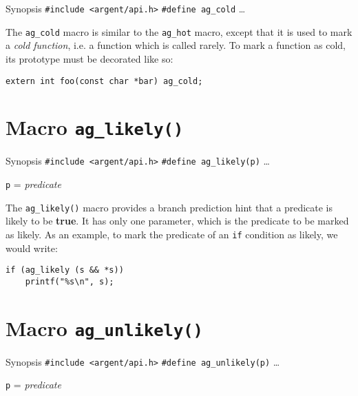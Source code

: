 \begin{bclogo}[logo=\bccrayon, noborder=true, barre=snake, couleurBarre=gray]
    {Synopsis}
  \verb|#include <argent/api.h>|
  \verb|#define ag_cold| \ldots
\end{bclogo}

The \verb|ag_cold| macro is similar to the \verb|ag_hot| macro, except
that it is used to mark a \emph{cold function}, i.e. a function which is called
rarely. To mark a function as cold, its prototype must be decorated like so:

\begin{lstlisting}[linewidth=1.0\linewidth,
    caption=Example use of ag\_cold]
extern int foo(const char *bar) ag_cold;
\end{lstlisting}


%


\section{Macro \texttt{ag\_likely()}}

\begin{bclogo}[logo=\bccrayon, noborder=true, barre=snake, couleurBarre=gray]
    {Synopsis}
  \verb|#include <argent/api.h>|
  \verb|#define ag_likely(p)| \ldots
  \par
  \texttt{p} = \emph{predicate}
\end{bclogo}

The \verb|ag_likely()| macro provides a branch prediction hint that a predicate
is likely to be \textbf{true}. It has only one parameter, which is the predicate 
to be marked as likely. As an example, to mark the predicate of an \verb|if| 
condition as likely, we would write:

\begin{lstlisting}[linewidth=1.0\linewidth,
    caption=Example use of ag\_likely()]
if (ag_likely (s && *s)) 
    printf("%s\n", s);
\end{lstlisting}


%


\section{Macro \texttt{ag\_unlikely()}}

\begin{bclogo}[logo=\bccrayon, noborder=true, barre=snake, couleurBarre=gray]
    {Synopsis}
  \verb|#include <argent/api.h>|
  \verb|#define ag_unlikely(p)| \ldots
  \par
  \texttt{p} = \emph{predicate}
\end{bclogo}

